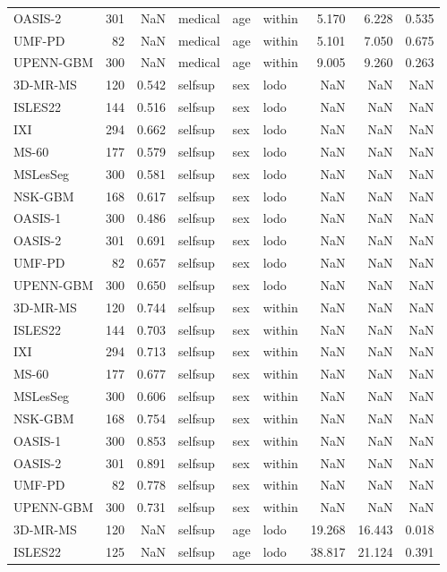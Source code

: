 \begin{tabular}{lrrlllrrr}
OASIS-2 & 301 & NaN & medical & age & within & 5.170 & 6.228 & 0.535 \\
UMF-PD & 82 & NaN & medical & age & within & 5.101 & 7.050 & 0.675 \\
UPENN-GBM & 300 & NaN & medical & age & within & 9.005 & 9.260 & 0.263 \\
3D-MR-MS & 120 & 0.542 & selfsup & sex & lodo & NaN & NaN & NaN \\
ISLES22 & 144 & 0.516 & selfsup & sex & lodo & NaN & NaN & NaN \\
IXI & 294 & 0.662 & selfsup & sex & lodo & NaN & NaN & NaN \\
MS-60 & 177 & 0.579 & selfsup & sex & lodo & NaN & NaN & NaN \\
MSLesSeg & 300 & 0.581 & selfsup & sex & lodo & NaN & NaN & NaN \\
NSK-GBM & 168 & 0.617 & selfsup & sex & lodo & NaN & NaN & NaN \\
OASIS-1 & 300 & 0.486 & selfsup & sex & lodo & NaN & NaN & NaN \\
OASIS-2 & 301 & 0.691 & selfsup & sex & lodo & NaN & NaN & NaN \\
UMF-PD & 82 & 0.657 & selfsup & sex & lodo & NaN & NaN & NaN \\
UPENN-GBM & 300 & 0.650 & selfsup & sex & lodo & NaN & NaN & NaN \\
3D-MR-MS & 120 & 0.744 & selfsup & sex & within & NaN & NaN & NaN \\
ISLES22 & 144 & 0.703 & selfsup & sex & within & NaN & NaN & NaN \\
IXI & 294 & 0.713 & selfsup & sex & within & NaN & NaN & NaN \\
MS-60 & 177 & 0.677 & selfsup & sex & within & NaN & NaN & NaN \\
MSLesSeg & 300 & 0.606 & selfsup & sex & within & NaN & NaN & NaN \\
NSK-GBM & 168 & 0.754 & selfsup & sex & within & NaN & NaN & NaN \\
OASIS-1 & 300 & 0.853 & selfsup & sex & within & NaN & NaN & NaN \\
OASIS-2 & 301 & 0.891 & selfsup & sex & within & NaN & NaN & NaN \\
UMF-PD & 82 & 0.778 & selfsup & sex & within & NaN & NaN & NaN \\
UPENN-GBM & 300 & 0.731 & selfsup & sex & within & NaN & NaN & NaN \\
3D-MR-MS & 120 & NaN & selfsup & age & lodo & 19.268 & 16.443 & 0.018 \\
ISLES22 & 125 & NaN & selfsup & age & lodo & 38.817 & 21.124 & 0.391 \\

\end{tabular}
